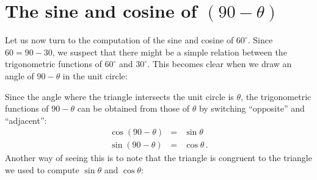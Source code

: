 \documentclass[11pt,a4paper]{article}
\begin{document}

\section{The sine and cosine of $(90-\theta)$}

Let us now turn to the computation of the sine and cosine of $60^\circ$. Since $60 = 90 - 30$, we suspect that there might be a simple relation between the trigonometric functions of $60^\circ$ and $30^\circ$. This becomes clear when we draw an angle of $90-\theta$ in the unit circle:
\begin{center}
\end{center}
Since the angle where the triangle intersects the unit circle is $\theta$, the trigonometric functions of $90-\theta$ can be obtained from those of $\theta$ by switching ``opposite'' and ``adjacent'':
\begin{eqnarray*}
\cos (90-\theta) &=& \sin \theta\\
\sin (90-\theta) &=& \cos \theta\,.
\end{eqnarray*}
Another way of seeing this is to note that the triangle is congruent to the triangle we used to compute $\sin\theta$ and $\cos \theta$:
\end{document}
